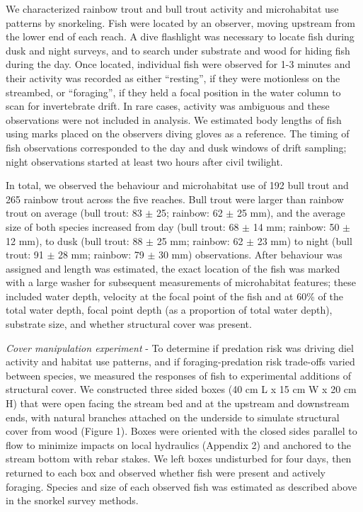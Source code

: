 \documentclass[]{article}
\begin{document}
We characterized rainbow trout and bull trout activity and microhabitat
use patterns by snorkeling. Fish were located by an observer, moving
upstream from the lower end of each reach. A dive flashlight was
necessary to locate fish during dusk and night surveys, and to search
under substrate and wood for hiding fish during the day. Once located,
individual fish were observed for 1-3 minutes and their activity was
recorded as either ``resting'', if they were motionless on the
streambed, or ``foraging'', if they held a focal position in the water
column to scan for invertebrate drift. In rare cases, activity was
ambiguous and these observations were not included in analysis. We
estimated body lengths of fish using marks placed on the observers
diving gloves as a reference. The timing of fish observations
corresponded to the day and dusk windows of drift sampling; night
observations started at least two hours after civil twilight.

In total, we observed the behaviour and microhabitat use of 192 bull
trout and 265 rainbow trout across the five reaches. Bull trout were
larger than rainbow trout on average (bull trout: 83 \(\pm\) 25;
rainbow: 62 \(\pm\) 25 mm), and the average size of both species
increased from day (bull trout: 68 \(\pm\) 14 mm; rainbow: 50 \(\pm\) 12
mm), to dusk (bull trout: 88 \(\pm\) 25 mm; rainbow: 62 \(\pm\) 23 mm)
to night (bull trout: 91 \(\pm\) 28 mm; rainbow: 79 \(\pm\) 30 mm)
observations. After behaviour was assigned and length was estimated, the
exact location of the fish was marked with a large washer for subsequent
measurements of microhabitat features; these included water depth,
velocity at the focal point of the fish and at 60\% of the total water
depth, focal point depth (as a proportion of total water depth),
substrate size, and whether structural cover was present.

\emph{Cover manipulation experiment} - To determine if predation risk
was driving diel activity and habitat use patterns, and if
foraging-predation risk trade-offs varied between species, we measured
the responses of fish to experimental additions of structural cover. We
constructed three sided boxes (40 cm L x 15 cm W x 20 cm H) that were
open facing the stream bed and at the upstream and downstream ends, with
natural branches attached on the underside to simulate structural cover
from wood (Figure 1). Boxes were oriented with the closed sides parallel
to flow to minimize impacts on local hydraulics (Appendix 2) and
anchored to the stream bottom with rebar stakes. We left boxes
undisturbed for four days, then returned to each box and observed
whether fish were present and actively foraging. Species and size of
each observed fish was estimated as described above in the snorkel
survey methods.
\end{document}

